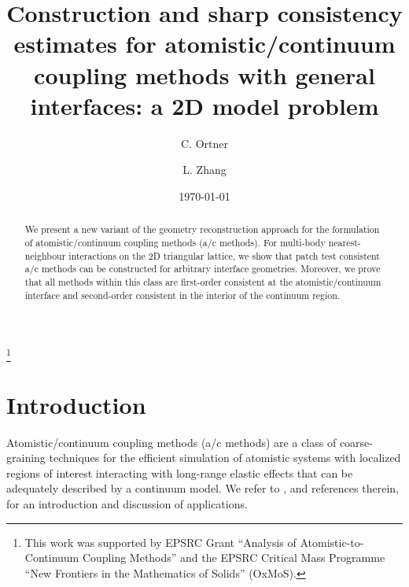 \documentclass[12pt, reqno, a4paper]{amsart}
\numberwithin{equation}{section}
\numberwithin{theorem}{section}
\numberwithin{remark}{section}
\begin{document}
\title[]{Construction and sharp consistency estimates for
  atomistic/continuum coupling methods with general interfaces: a 2D
  model problem}

\author{C. Ortner}
\address{C. Ortner\\ Mathematics Institute \\ Zeeman Building \\
  University of Warwick \\ Coventry CV4 7AL \\ UK}

\author{L. Zhang}
\address{L. Zhang \\ Mathematical Institute\\
  24-29 St Giles' \\ Oxford OX1 3LB \\ UK}

\date{\today}

\thanks{This work was supported by EPSRC Grant ``Analysis of
  Atomistic-to-Continuum Coupling Methods'' and the EPSRC Critical
  Mass Programme ``New Frontiers in the Mathematics of Solids''
  (OxMoS).}



\begin{abstract}
  We present a new variant of the geometry reconstruction approach for
  the formulation of atomistic/continuum coupling methods (a/c
  methods). For multi-body nearest-neighbour interactions on the 2D
  triangular lattice, we show that patch test consistent a/c methods
  can be constructed for arbitrary interface geometries. Moreover, we
  prove that all methods within this class are first-order consistent
  at the atomistic/continuum interface and second-order consistent in
  the interior of the continuum region.
\end{abstract}

\maketitle

\section{Introduction}
Atomistic/continuum coupling methods (a/c methods) are a class of
coarse-graining techniques for the efficient simulation of atomistic
systems with localized regions of interest interacting with long-range
elastic effects that can be adequately described by a continuum
model. We refer to \cite{Miller:2008}, and references therein, for an
introduction and discussion of applications.
\end{document}

